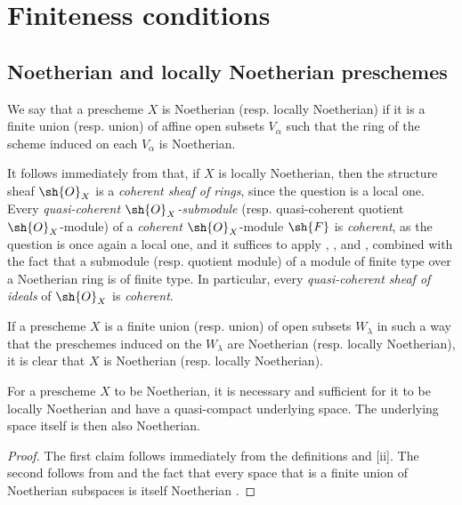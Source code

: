 \section{Finiteness conditions}
\label{section:I.6}

\subsection{Noetherian and locally Noetherian preschemes}
\label{subsection:I.6.1}

\begin{definition}[6.1.1]
\label{I.6.1.1}
We say that a prescheme $X$ is Noetherian (resp. locally Noetherian) if it is a finite union (resp. union) of affine open subsets $V_\alpha$ such that the ring of the scheme induced on each $V_\alpha$ is Noetherian.
\end{definition}

It follows immediately from  that, if $X$ is locally Noetherian, then the structure sheaf $\sh{O}_X$ is a \emph{coherent sheaf of rings}, since the question is a local one.
Every \emph{quasi-coherent $\sh{O}_X$-submodule}
(resp. quasi-coherent quotient $\sh{O}_X$-module) of a \emph{coherent} $\sh{O}_X$-module $\sh{F}$ is \emph{coherent}, as the question is once again a local one, and it suffices to apply , , and , combined with the fact that a submodule (resp. quotient module) of a module of finite type over a Noetherian ring is of finite type.
In particular, every \emph{quasi-coherent sheaf of ideals} of $\sh{O}_X$ is \emph{coherent}.

If a prescheme $X$ is a finite union (resp. union) of open subsets $W_\lambda$ in such a way that the preschemes induced on the $W_\lambda$ are Noetherian (resp. locally Noetherian), it is clear that $X$ is Noetherian (resp. locally Noetherian).

\begin{proposition}[6.1.2]
\label{I.6.1.2}
For a prescheme $X$ to be Noetherian, it is necessary and sufficient for it to be locally Noetherian and have a quasi-compact underlying space.
The underlying space itself is then also Noetherian.
\end{proposition}

\begin{proof}
The first claim follows immediately from the definitions and [ii].
The second follows from  and the fact that every space that is a finite union of Noetherian subspaces is itself Noetherian .
\end{proof}

